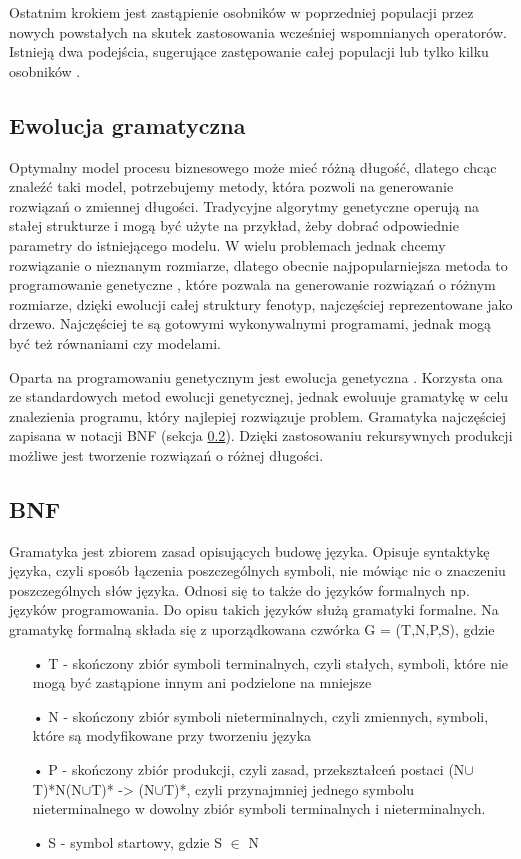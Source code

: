 Ostatnim krokiem jest zastąpienie osobników w poprzedniej populacji przez nowych powstałych na skutek zastosowania wcześniej wspomnianych operatorów. Istnieją dwa podejścia, sugerujące zastępowanie całej populacji lub tylko kilku osobników \cite{SSvsGen}.


\subsection{Ewolucja gramatyczna}
Optymalny model procesu biznesowego może mieć różną długość, dlatego chcąc znaleźć taki model, potrzebujemy metody, która pozwoli na generowanie rozwiązań o zmiennej długości. Tradycyjne algorytmy genetyczne operują na stałej strukturze i mogą być użyte na przykład, żeby dobrać odpowiednie parametry do istniejącego modelu. W wielu problemach jednak chcemy rozwiązanie o nieznanym rozmiarze, dlatego obecnie najpopularniejsza metoda to programowanie genetyczne \cite{Koza:1990:pat-GAsp}\cite{10.5555/138936}, które pozwala na generowanie rozwiązań o różnym rozmiarze, dzięki ewolucji całej struktury fenotyp, najczęściej reprezentowane jako drzewo. Najczęściej te są gotowymi wykonywalnymi programami, jednak mogą być też równaniami czy modelami.

Oparta na programowaniu genetycznym jest ewolucja genetyczna \cite{ryan_collins_neill_1998}. Korzysta ona ze standardowych metod ewolucji genetycznej, jednak ewoluuje gramatykę w celu znalezienia programu, który najlepiej rozwiązuje problem. Gramatyka najczęściej zapisana w notacji BNF (sekcja \ref{sec:BNF}). Dzięki zastosowaniu rekursywnych produkcji możliwe jest tworzenie rozwiązań o różnej długości. 

\subsection{BNF}
\label{sec:BNF}
Gramatyka jest zbiorem zasad opisujących budowę języka. Opisuje syntaktykę języka, czyli sposób łączenia poszczególnych symboli, nie mówiąc nic o znaczeniu poszczególnych słów języka. Odnosi się to także do języków formalnych np. języków programowania. Do opisu takich języków służą gramatyki formalne. Na gramatykę formalną składa się z uporządkowana czwórka G = (T,N,P,S), gdzie 

\begin{itemize}
  \item[•] T - skończony zbiór symboli terminalnych, czyli stałych, symboli, które nie mogą być zastąpione innym ani podzielone na mniejsze 
  \item[•] N - skończony zbiór symboli nieterminalnych, czyli zmiennych, symboli, które są modyfikowane przy tworzeniu języka
  \item[•] P - skończony zbiór produkcji, czyli zasad, przekształceń postaci (N$\cup$T)*N(N$\cup$T)* -> (N$\cup$T)*, czyli przynajmniej jednego symbolu nieterminalnego w dowolny zbiór symboli terminalnych i nieterminalnych.
  \item[•] S - symbol startowy, gdzie S $\in$ N
\end{itemize}

